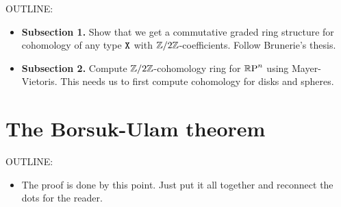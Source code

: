\documentclass{amsart}
\begin{document}
OUTLINE:
\begin{itemize}
\item
  \textbf{Subsection 1.} Show that we get a commutative
  graded ring structure for cohomology of any type $ \mathtt{X} $
  with $ \mathbb{Z}/2\mathbb{Z} $-coefficients. Follow Brunerie's thesis.
\item
  \textbf{Subsection 2.} Compute $ \mathbb{Z}/2\mathbb{Z} $-cohomology ring
  for $ \mathbb{R}\textrm{P}^n $ using Mayer-Vietoris.  This needs us to
  first compute cohomology for disks and spheres.  
\end{itemize}


\section{The Borsuk-Ulam theorem}
\label{sec:borsuk-ulam}

OUTLINE:
\begin{itemize}
\item
  The proof is done by this point. Just put it all
  together and reconnect the dots for the reader.
\end{itemize}



\nocite{shulman:bfp,brunerie:thesis,br:rp-hott}

\end{document}
